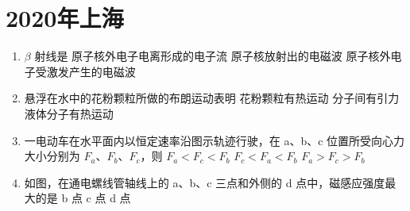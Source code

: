 \documentclass[\gkver]{gaokaozhenti}
\begin{document}
\chapter{2020年上海}

\begin{enumerate}
\item
$\beta$ 射线是
{原子核外电子电离形成的电子流}
{原子核放射出的电磁波}
{原子核外电子受激发产生的电磁波}

\item
悬浮在水中的花粉颗粒所做的布朗运动表明
{花粉颗粒有热运动}
{分子间有引力}
{液体分子有热运动}

\item
一电动车在水平面内以恒定速率沿图示轨迹行驶，在 a、b、c 位置所受向心力大小分别为 $F_{a}$、$F_{b}$、$F_{c}$，则
\onepicture[w=3.54cm]{}
{$F_{a} < F_{c} < F_{b}$}
{$F_{c} < F_{a} < F_{b}$}
{$F_{a} > F_{c} > F_{b}$}

\item
如图，在通电螺线管轴线上的 a、b、c 三点和外侧的 d 点中，磁感应强度最大的是
\onepicture[w=4.31cm]{}
{b 点}
{c 点}
{d 点}


\end{enumerate}
\end{document}
